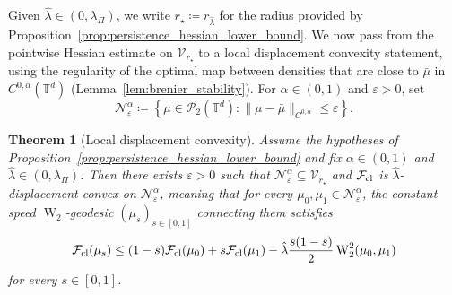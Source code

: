 \documentclass[11pt]{article}
\numberwithin{equation}{section}
\newtheorem{theorem}{Theorem}[section]
\theoremstyle{definition}
\newcommand{\T}{\mathbb{T}}
\newcommand{\Pcal}{\mathcal{P}}
\newcommand{\F}{\mathcal{F}}
\newcommand{\Wtwo}{\operatorname{W}_2}
\newcommand{\Nbhd}{\mathcal{N}}
\begin{document}
Given $\hat{\lambda} \in (0, \lambda_\Pi)$, we write $r_\star \coloneqq r_{\hat{\lambda}}$ for the radius provided by Proposition~\ref{prop:persistence_hessian_lower_bound}.
We now pass from the pointwise Hessian estimate on $\mathcal{V}_{r_\star}$ to a local displacement convexity statement, using the regularity of the optimal map between densities that are close to $\bar\mu$ in $C^{0,\alpha}(\T^d)$ (Lemma~\ref{lem:brenier_stability}).
For $\alpha \in (0,1)$ and $\varepsilon > 0$, set
\[
\Nbhd^\alpha_\varepsilon \coloneqq \left\{\mu \in \Pcal_2(\T^d) : \|\mu - \bar\mu\|_{C^{0,\alpha}} \le \varepsilon \right\}.
\]

\begin{theorem}[Local displacement convexity]
    \label{thm:local_strong_displacement_convexity}
    Assume the hypotheses of Proposition~\ref{prop:persistence_hessian_lower_bound} and fix $\alpha \in (0,1)$ and $\hat{\lambda} \in (0,\lambda_\Pi)$. 
    Then there exists $\varepsilon > 0$ such that $\Nbhd^\alpha_\varepsilon \subseteq \mathcal{V}_{r_\star}$ and $\F_{\rm cl}$ is $\hat{\lambda}$-displacement convex on $\Nbhd^\alpha_\varepsilon$, meaning that for every $\mu_0, \mu_1 \in \Nbhd^\alpha_\varepsilon$, the constant speed $\Wtwo$-geodesic $(\mu_s)_{s \in [0,1]}$ connecting them satisfies
    \[
    \F_{\rm cl}(\mu_s) \le (1-s)\F_{\rm cl}(\mu_0) + s \F_{\rm cl}(\mu_1) - \hat{\lambda}\frac{s(1-s)}{2} \Wtwo^2(\mu_0,\mu_1)
    \]
    for every $s \in [0,1]$.
\end{theorem}
\end{document}
